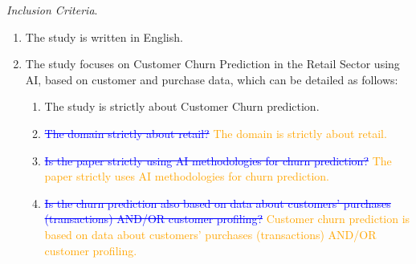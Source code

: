 \textit{Inclusion Criteria}. 
\begin{enumerate}[label=(IC\arabic*), leftmargin=19.5mm, itemsep=1pt, parsep=0pt]
\item The study is written in English.
\item The study focuses on Customer Churn Prediction in the Retail Sector using AI, based on customer and purchase data, which can be detailed as follows:
\begin{enumerate}[label=(IC2.\arabic*), leftmargin=19.5mm, itemsep=1pt, parsep=0pt]
\item The study is strictly about Customer Churn prediction.
\item \textcolor{blue}{\sout{The domain strictly about retail?}} \textcolor{orange}{The domain is strictly about retail.}
\item \textcolor{blue}{\sout{Is the paper strictly using AI methodologies for churn prediction?}} \textcolor{orange}{The paper strictly uses AI methodologies for churn prediction.}
\item \textcolor{blue}{\sout{Is the churn prediction also based on data about customers’ purchases (transactions) AND/OR customer profiling?}} \textcolor{orange}{Customer churn prediction is based on data about customers’ purchases (transactions) AND/OR customer profiling.}
\end{enumerate}
\end{enumerate}